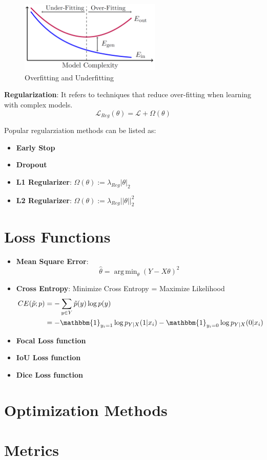 \documentclass[a4paper]{article}
\DeclareMathOperator*{\argmin}{arg\,min}
\begin{document}
\begin{figure}[h]
	\centering
	\includegraphics[width=0.6\textwidth]{images/overfitting.png}
	\caption{Overfitting and Underfitting}
	\label{fig:mesh1}
\end{figure}

\textbf{Regularization}: It refers to techniques that reduce over-fitting when learning with complex models.
\begin{equation}
	\mathcal{L}_{Reg} (\theta) = \mathcal{L} + \Omega(\theta)
\end{equation}

Popular regularziation methods can be listed as:
\begin{itemize}
	\item \textbf{Early Stop}
	\item \textbf{Dropout}
	\item \textbf{L1 Regularizer}: $\Omega(\theta) := \lambda_{Reg} | \theta | _2$
	\item \textbf{L2 Regularizer}: $\Omega(\theta) := \lambda_{Reg} || \theta || _2^2$
\end{itemize}

\section{Loss Functions}

\begin{itemize}
	\item \textbf{Mean Square Error}:
	\begin{equation}
		\hat{\theta} = \argmin_{\theta} ( Y - X \theta )^2
	\end{equation}
	\item \textbf{Cross Entropy}: Minimize Cross Entropy = Maximize Likelihood
	\begin{align}
		CE(\tilde{p}; p) &= - \sum_{y \in Y} \tilde{p} (y) \log p(y) \\
		&= - \mathbbm{1}_{y_i = 1} \log p_{Y|X} (1 | x_i) - \mathbbm{1}_{y_i = 0} \log p_{Y|X} (0 | x_i)
	\end{align}
	\item \textbf{Focal Loss function}
	\item \textbf{IoU Loss function}
	\item \textbf{Dice Loss function}
\end{itemize}

\section{Optimization Methods}

\section{Metrics}



\end{document}
